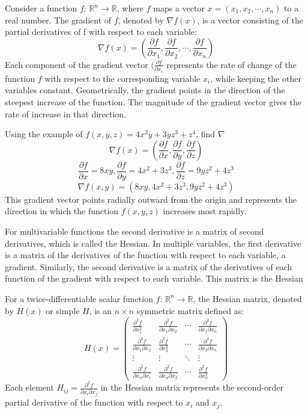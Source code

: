 \documentclass[12pt]{article}
\theoremstyle{definition}
\begin{document}
Consider a function $f$: $\mathbb{R}^n \to \mathbb{R}$, where $f$ maps a vector $x = (x_1, x_2, \cdots, x_n)$ to a real number. The gradient of $f$, denoted by $\nabla f(x)$, is a vector consisting of the partial derivatives of f with respect to each variable: 
\[
\nabla f(x) = (\frac{\partial f}{\partial x_1}, \frac{\partial f}{\partial x_2}, \cdots, \frac{\partial f}{\partial x_n})
\]
Each component of the gradient vector $(\frac{\partial f}{\partial x_i}$ represents the rate of change of the function $f$ with respect to the corresponding variable $x_i$, while keeping the other variables constant. Geometrically, the gradient points in the direction of the steepest increase of the function. The magnitude of the gradient vector gives the rate of increase in that direction.

Using the example of $f(x,y,z) = 4x^2y+3yz^3 + z^4$, find $\nabla$
\[
\nabla f(x) = (\frac{\partial f}{\partial x}, \frac{\partial f}{\partial y}, \frac{\partial f}{\partial z})
\]
\[
\frac{\partial f}{\partial x}=8xy, \frac{\partial f}{\partial y} = 4x^2+3z^3, \frac{\partial f}{\partial z}=9yz^2+4z^3
\]
\[
\nabla f(x,y) = (8xy, 4x^2 + 3z^3, 9yz^2 + 4z^3)
\]
This gradient vector points radially outward from the origin and represents the direction in which the function $f(x, y, z)$ increases most rapidly. 

For multivariable functions the second derivative is a matrix of second derivatives, which is called the Hessian. In multiple variables, the first derivative is a matrix of the derivatives of the function with respect to each variable, a gradient. Similarly, the second derivative is a matrix of the derivatives of each function of the gradient with respect to each variable. This matrix is the Hessian

For a twice-differentiable scalar function $f$: $\mathbb{R}^n \to \mathbb{R}$, the Hessian matrix, denoted by $H(x)$ or simple $H$, is an $n \times n$ symmetric matrix defined as:
\[
H(x) = \begin{pmatrix}
\frac{\partial^2 f}{\partial x_1^2} & \frac{\partial^2 f}{\partial x_1 \partial x_2} & \cdots & \frac{\partial^2 f}{\partial x_1 \partial x_n} \\

\frac{\partial^2 f}{\partial x_1 \partial x_2} & \frac{\partial^2 f}{\partial x_2^2} & \cdots & \frac{\partial^2 f}{\partial x_2 \partial x_n} \\

\vdots & \vdots & \ddots & \vdots \\

\frac{\partial^2 f}{\partial x_n \partial x_1} & \frac{\partial^2 f}{\partial x_n \partial x_2} & \cdots & \frac{\partial^2 f}{\partial x_n^2}
\end{pmatrix}
\]
Each element $H_{ij} = \frac{\partial^2 f}{\partial x_i \partial x_j}$ in the Hessian matrix represents the second-order partial derivative of the function with respect to $x_i$ and $x_j$.
\end{document}
